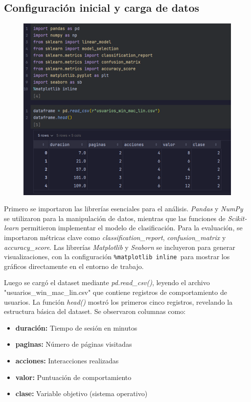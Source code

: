 \documentclass{article}
\begin{document}
\subsection*{Configuración inicial y carga de datos}

\begin{figure}[H]
\centering
\includegraphics[width=1.0\textwidth]{Actividad-11/Imagen1.png}
\end{figure}

Primero se importaron las librerías esenciales para el análisis. \textit{Pandas} y \textit{NumPy} se utilizaron para la manipulación de datos, mientras que las funciones de \textit{Scikit-learn} permitieron implementar el modelo de clasificación. Para la evaluación, se importaron métricas clave como  \textit{classification\_report}, \textit{confusion\_matrix} y \textit{accuracy\_score}. Las librerías \textit{Matplotlib} y \textit{Seaborn} se incluyeron para generar visualizaciones, con la configuración \texttt{\%matplotlib inline }para mostrar los gráficos directamente en el entorno de trabajo.

Luego se cargó el dataset mediante \textit{pd.read\_csv()}, leyendo el archivo "usuarios\_win\_mac\_lin.csv" que contiene registros de comportamiento de usuarios. La función \textit{head()} mostró los primeros cinco registros, revelando la estructura básica del dataset. Se observaron columnas como:

\begin{itemize}
    \item \textbf{duración:} Tiempo de sesión en minutos
    \item \textbf{paginas:} Número de páginas visitadas
    \item \textbf{acciones:} Interacciones realizadas
    \item \textbf{valor:} Puntuación de comportamiento
    \item \textbf{clase:} Variable objetivo (sistema operativo)
\end{itemize}
\end{document}
